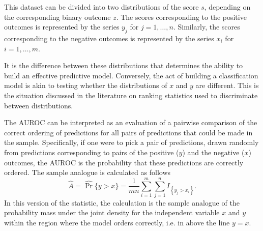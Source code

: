 This dataset can be divided into two distributions of the score $s$, depending on the corresponding binary outcome $z$. 
The scores corresponding to the positive outcomes is represented by the series $y_j$ for $j = 1, \dots, n$. Similarly, the scores corresponding to the negative outcomes is represented by the series $x_i$ for $i = 1, \dots, m$.


It is the difference between these distributions that determines the ability to build an effective predictive model. 
Conversely, the act of building a classification model is akin to testing whether the distributions of $x$ and $y$ are different. 
This is the situation discussed in the literature on ranking statistics used to discriminate between distributions. 


The AUROC can be interpreted as an evaluation of a pairwise comparison of the correct ordering of predictions for all pairs of predictions that could be made in the sample.
%
Specifically, if one were to pick a pair of predictions, drawn randomly from predictions corresponding to pairs of the positive ($y$) and the negative ($x$) outcomes, the AUROC is the probability that these predictions are correctly ordered.
%
The sample analogue is calculated as follows
%
\begin{equation} \label{eqn:auroc}
    \hat{A} = \hat{\Pr} \{ y > x \} = \frac{1}{m n} \sum_{i = 1}^{m} \sum_{j = 1}^{n} I_{\left\{ y_j > x_i \right\}}.
\end{equation}
%
In this version of the statistic, the calculation is the sample analogue of the probability mass under the joint density for the independent variable $x$ and $y$ within the region where the model orders correctly, i.e. in above the line $y=x$. 


